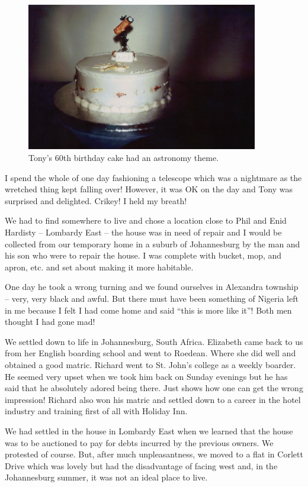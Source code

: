 \begin{figure}
  \centering
  \includegraphics[width=0.9\textwidth]{photos/cake-astronomy.jpg}
  \caption{Tony's 60th birthday cake had an astronomy theme.}
  \label{cake-astronomy}
\end{figure}

I spend the whole of one day fashioning a telescope which was a
nightmare as the wretched thing kept falling over! However, it was OK
on the day and Tony was surprised and delighted. Crikey! I held my
breath!

We had to find somewhere to live and chose a location close to Phil
and Enid Hardisty -- Lombardy East -- the house was in need of repair
and I would be collected from our temporary home in a suburb of
Johannesburg by the man and his son who were to repair the house. I
was complete with bucket, mop, and apron, etc. and set about making it
more habitable.

One day he took a wrong turning and we found ourselves in Alexandra
township -- very, very black and awful. But there must have been
something of Nigeria left in me because I felt I had come home and
said ``this is more like it''! Both men thought I had gone mad!

We settled down to life in Johannesburg, South Africa. Elizabeth came
back to us from her English boarding school and went to Roedean. Where
she did well and obtained a good matric. Richard went to St. John's
college as a weekly boarder. He seemed very upset when we took him
back on Sunday evenings but he has said that he absolutely adored
being there. Just shows how one can get the wrong impression! Richard
also won his matric and settled down to a career in the hotel industry
and training first of all with Holiday Inn.

We had settled in the house in Lombardy East when we learned that the
house was to be auctioned to pay for debts incurred by the previous
owners. We protested of course. But, after much unpleasantness, we
moved to a flat in Corlett Drive which was lovely but had the
disadvantage of facing west and, in the Johannesburg summer, it was
not an ideal place to live.

